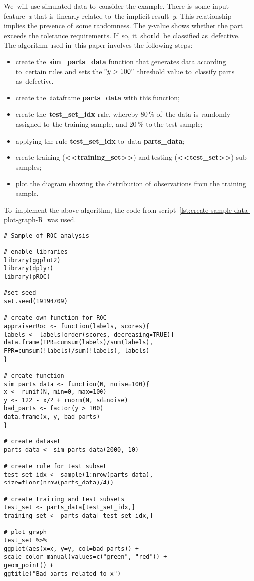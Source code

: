 \documentclass[]{scrreprt}
\begin{document}
We~will use simulated data to~consider the example. There is~some input feature~\emph{x} that is~linearly related to~the implicit result~\emph{y}. This relationship implies the presence of~some randomness. The y-value shows whether the part exceeds the tolerance requirements. If~so, it~should~be classified as~defective. The algorithm used in~this paper involves the following steps:
\begin{itemize}
	\item create the~\textbf{sim\_parts\_data} function that generates data according to~certain rules and sets the $"y>100"$ threshold value to~classify parts as~defective.
	\item create the~dataframe \textbf{parts\_data} with this function;
	\item create the~\textbf{test\_set\_idx} rule, whereby 80\,\% of~the data is~randomly assigned to~the training sample, and 20\,\% to the test sample;
	\item applying the rule \textbf{test\_set\_idx} to~data \textbf{parts\_data};
	\item create training (\textbf{<<training\_set>>}) and testing (\textbf{<<test\_set>>}) sub-samples;
	\item plot the diagram showing the distribution of~observations from the training sample.
\end{itemize}
To~implement the above algorithm, the code from script~\ref{lst:create-sample-data-plot-graph-R} was used.
%
\begin{lstlisting}[float, caption = Creation and primary visualization of~data on~quality and defective parts, firstnumber=1, label= lst:create-sample-data-plot-graph-R]
# Sample of ROC-analysis

# enable libraries
library(ggplot2)
library(dplyr)
library(pROC)

#set seed
set.seed(19190709)

# create own function for ROC
appraiserRoc <- function(labels, scores){
labels <- labels[order(scores, decreasing=TRUE)]
data.frame(TPR=cumsum(labels)/sum(labels),
FPR=cumsum(!labels)/sum(!labels), labels)
}

# create function 
sim_parts_data <- function(N, noise=100){
x <- runif(N, min=0, max=100)
y <- 122 - x/2 + rnorm(N, sd=noise)
bad_parts <- factor(y > 100)
data.frame(x, y, bad_parts)
}

# create dataset
parts_data <- sim_parts_data(2000, 10)

# create rule for test subset
test_set_idx <- sample(1:nrow(parts_data), size=floor(nrow(parts_data)/4))

# create training and test subsets
test_set <- parts_data[test_set_idx,]
training_set <- parts_data[-test_set_idx,]

# plot graph
test_set %>% 
ggplot(aes(x=x, y=y, col=bad_parts)) + 
scale_color_manual(values=c("green", "red")) + 
geom_point() + 
ggtitle("Bad parts related to x")

\end{lstlisting}
%
\end{document}

